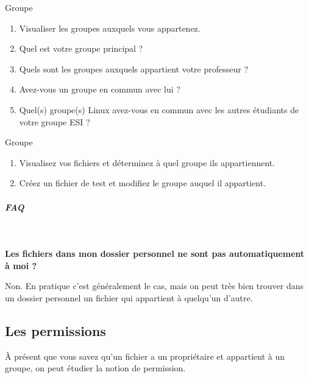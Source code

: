 \documentclass[a4paper,11pt]{article}
\begin{document}
\begin{Exercice}{Groupe}
					\textcolor{white}{.} \par

\par

\begin{enumerate}
	
	\item Visualiser les groupes auxquels vous appartenez.
	\item Quel est votre groupe principal ? 
	\item Quels sont les groupes auxquels appartient votre professeur ?
	\item Avez-vous un groupe en commun avec lui ?
	\item Quel(s) groupe(s) Linux avez-vous en commun avec les autres \'etudiants de votre groupe ESI ?
\end{enumerate}	
		\end{Exercice}
	

\begin{Exercice}{Groupe}	
					\textcolor{white}{.} \par

\par

\begin{enumerate}
	
	\item Visualisez vos fichiers et d\'eterminez \`a quel groupe ils appartiennent.
	\item Cr\'eez un fichier de test et modifiez le groupe auquel il appartient.
\end{enumerate}
		\end{Exercice}


		\subparagraph{FAQ} 

\textcolor{white}{.} \par

\par
\textbf{Les fichiers dans mon dossier personnel ne sont pas automatiquement \`a moi ?}
\par

Non. En pratique c'est g\'en\'eralement le cas, 
mais on peut tr\`es bien trouver dans un dossier personnel un fichier qui appartient \`a quelqu'un d'autre.  

\par

        \subsection{Les permissions}  
\`A pr\'esent que vous savez qu'un fichier a un propri\'etaire et appartient \`a un groupe, 
on peut \'etudier la notion de permission.    
\end{document}

